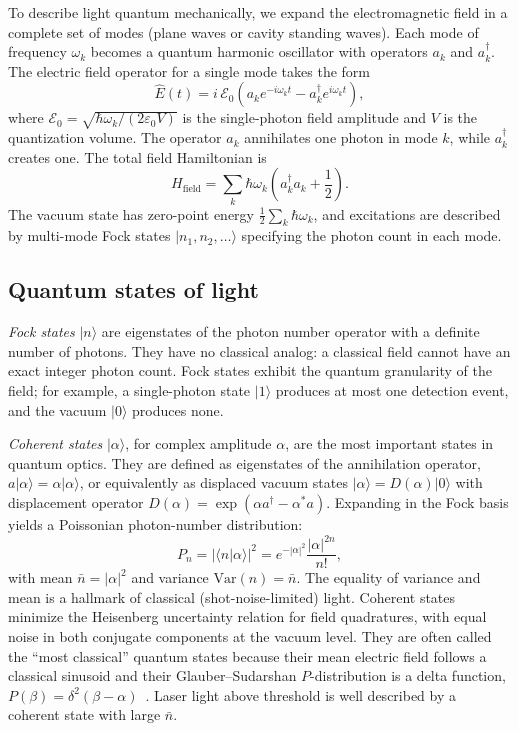 \documentclass[%
 reprint,
 amsmath,amssymb,
 aps,
]{revtex4-2}
\begin{document}
To describe light quantum mechanically, we expand the electromagnetic field in a complete set of modes (plane waves or cavity standing waves). Each mode of frequency $\omega_k$ becomes a quantum harmonic oscillator with operators $a_k$ and $a_k^\dagger$. The electric field operator for a single mode takes the form
\begin{equation}
\hat{E}(t) = i\, \mathcal{E}_0 \left( a_k e^{-i \omega_k t} - a_k^\dagger e^{i \omega_k t} \right),
\label{eq:efield}
\end{equation}
where $\mathcal{E}_0 = \sqrt{\hbar \omega_k / (2 \varepsilon_0 V)}$ is the single-photon field amplitude and $V$ is the quantization volume. The operator $a_k$ annihilates one photon in mode $k$, while $a_k^\dagger$ creates one. The total field Hamiltonian is
\begin{equation}
H_{\text{field}} = \sum_k \hbar \omega_k \left( a_k^\dagger a_k + \frac{1}{2} \right).
\label{eq:Hfield}
\end{equation}
The vacuum state has zero-point energy $\tfrac{1}{2} \sum_k \hbar \omega_k$, and excitations are described by multi-mode Fock states $|n_1, n_2, \ldots\rangle$ specifying the photon count in each mode.


\subsection{Quantum states of light}
\label{sec:states}

\textit{Fock states} $|n\rangle$ are eigenstates of the photon number operator with a definite number of photons. They have no classical analog: a classical field cannot have an exact integer photon count. Fock states exhibit the quantum granularity of the field; for example, a single-photon state $|1\rangle$ produces at most one detection event, and the vacuum $|0\rangle$ produces none.

\textit{Coherent states} $|\alpha\rangle$, for complex amplitude $\alpha$, are the most important states in quantum optics. They are defined as eigenstates of the annihilation operator, $a|\alpha\rangle = \alpha|\alpha\rangle$, or equivalently as displaced vacuum states $|\alpha\rangle = D(\alpha)|0\rangle$ with displacement operator $D(\alpha) = \exp(\alpha a^\dagger - \alpha^* a)$. Expanding in the Fock basis yields a Poissonian photon-number distribution:
\begin{equation}
P_n = |\langle n|\alpha\rangle|^2 = e^{-|\alpha|^2} \frac{|\alpha|^{2n}}{n!},
\label{eq:poisson}
\end{equation}
with mean $\bar{n} = |\alpha|^2$ and variance $\text{Var}(n) = \bar{n}$. The equality of variance and mean is a hallmark of classical (shot-noise-limited) light. Coherent states minimize the Heisenberg uncertainty relation for field quadratures, with equal noise in both conjugate components at the vacuum level. They are often called the ``most classical'' quantum states because their mean electric field follows a classical sinusoid and their Glauber--Sudarshan $P$-distribution is a delta function, $P(\beta) = \delta^2(\beta - \alpha)$~\cite{glauber1963}. Laser light above threshold is well described by a coherent state with large $\bar{n}$.
\end{document}
